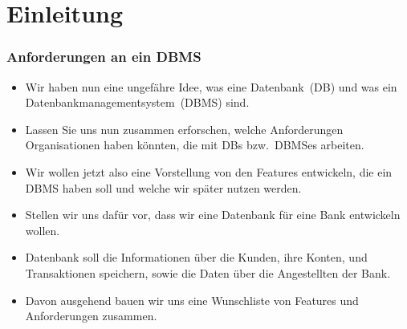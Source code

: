 \documentclass[aspectratio=169,mathserif,notheorems]{beamer}%
\subtitle{3. Anforderungen an ein DBMS}%
\begin{document}
%
%
\startPresentation%
%
\section{Einleitung}%
%
\begin{frame}[t]%
\frametitle{Anforderungen an ein DBMS}%
\begin{itemize}%
%
\item Wir haben nun eine ungefähre Idee, was eine Datenbank~(DB) und was ein Datenbankmanagementsystem~(DBMS) sind.%
\item<2-> Lassen Sie uns nun zusammen erforschen, welche Anforderungen Organisationen haben könnten, die mit DBs bzw.\ DBMSes arbeiten.%
\item<3-> Wir wollen jetzt also eine Vorstellung von den Features entwickeln, die ein DBMS haben soll und welche wir später nutzen werden.\bigskip%
\item<3-> Stellen wir uns dafür vor, dass wir eine Datenbank für eine Bank entwickeln wollen.%
\item<4-> Datenbank soll die Informationen über die Kunden, ihre Konten, und Transaktionen speichern, sowie die Daten über die Angestellten der Bank.%
\item<5-> Davon ausgehend bauen wir uns eine Wunschliste von Features und Anforderungen zusammen.%
%
\end{itemize}%
\end{frame}%
%
\end{document}
